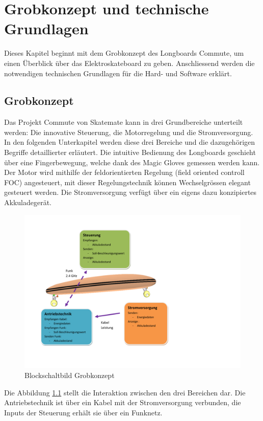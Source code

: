 \chapter{Grobkonzept und technische Grundlagen}
\label{TechnischeGrundlagen}
Dieses Kapitel beginnt mit dem Grobkonzept des Longboards Commute, um einen Überblick über das Elektroskateboard zu geben. Anschliessend werden die notwendigen technischen Grundlagen für die Hard- und Software erklärt.

\section{Grobkonzept}
\label{Grobkonzept}
Das Projekt Commute von Skatemate kann in drei Grundbereiche unterteilt werden: Die innovative Steuerung, die Motorregelung und die Stromversorgung. \\
In den folgenden Unterkapitel werden diese drei Bereiche und die dazugehörigen Begriffe detaillierter erläutert. Die intuitive Bedienung des Longboards geschieht über eine Fingerbewegung, welche dank des Magic Gloves gemessen werden kann. Der Motor wird mithilfe der feldorientierten Regelung (field oriented controll FOC) angesteuert, mit dieser Regelungstechnik können Wechselgrössen elegant gesteuert werden. Die Stromversorgung verfügt über ein eigens dazu konzipiertes Akkuladegerät. 
\begin{figure}[H]
	\centering
	\includegraphics[width=0.8\linewidth, keepaspectratio]{images/Grobkonzept_Blockschaltbild_grob}
	\caption[Blockschaltbild Grobkonzept]{Blockschaltbild Grobkonzept}
	\label{fig:grobkonzeptblockschaltbildgrob}
\end{figure}
Die Abbildung \ref{fig:grobkonzeptblockschaltbildgrob} stellt die Interaktion zwischen den drei Bereichen dar. Die Antriebstechnik ist über ein Kabel mit der Stromversorgung verbunden, die Inputs der Steuerung erhält sie über ein Funknetz. \\
